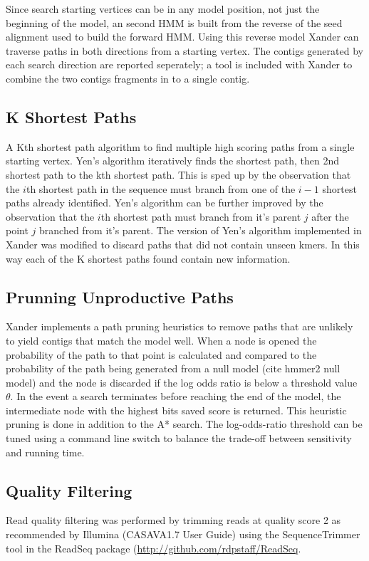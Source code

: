 \documentclass[10pt]{bmc_article}
\newenvironment{bmcformat}{\begin{raggedright}\baselineskip20pt\sloppy\setboolean{publ}{false}}{\end{raggedright}\baselineskip20pt\sloppy}
\begin{document}
\begin{bmcformat}
Since search starting vertices can be in any model position, not just the beginning of the model, an second HMM is built from the reverse of the seed alignment used to build the forward HMM.  Using this reverse model Xander can traverse paths in both directions from a starting vertex.  The contigs generated by each search direction are reported seperately; a tool is included with Xander to combine the two contigs fragments in to a single contig.

\subsection*{K Shortest Paths}
A Kth shortest path algorithm\cite{yen_finding_1971} to find multiple high scoring paths from a single starting vertex.  Yen's algorithm iteratively finds the shortest path, then 2nd shortest path to the kth shortest path.  This is sped up by the observation that the $i$th shortest path in the sequence must branch from one of the $i-1$ shortest paths already identified.  Yen's algorithm can be further improved by the observation that the $i$th shortest path must branch from it's parent $j$ after the point $j$ branched from it's parent\cite{lawler_procedure_1972}.  The version of Yen's algorithm implemented in Xander was modified to discard paths that did not contain unseen kmers.  In this way each of the K shortest paths found contain new information.

\subsection*{Prunning Unproductive Paths}
Xander implements a path pruning heuristics to remove paths that are unlikely to yield contigs that match the model well.  When a node is opened the probability of the path to that point is calculated and compared to the probability of the path being generated from a null model (cite hmmer2 null model) and the node is discarded if the log odds ratio is below a threshold value $\theta$. In the event a search terminates before reaching the end of the model, the intermediate node with the highest bits saved score is returned.  This heuristic pruning is done in addition to the A* search. The log-odds-ratio threshold can be tuned using a command line switch to balance the trade-off between sensitivity and running time.

\subsection*{Quality Filtering}
Read quality filtering was performed by trimming reads at quality score 2 as recommended by Illumina (CASAVA1.7 User Guide) using the SequenceTrimmer tool in the ReadSeq package (\url{http://github.com/rdpstaff/ReadSeq}.


\end{bmcformat}
\end{document}
